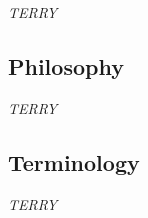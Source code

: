 {\it TERRY}


\subsection{Philosophy}
\label{sec:phil}

{\it TERRY}

\subsection{Terminology}
\label{sec:terminology}


{\it TERRY}

